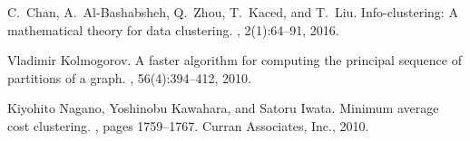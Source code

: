 \documentclass[portrait,final,a1paper,fontscale=0.3]{baposter}
\begin{document}
\begin{poster}
{\begin{thebibliography}{1}
 C.~Chan, A.~Al-Bashabsheh, Q.~Zhou, T.~Kaced, and T.~Liu.
\newblock Info-clustering: A mathematical theory for data clustering.
, 2(1):64--91, 2016.
  
Vladimir Kolmogorov.
\newblock A faster algorithm for computing the principal sequence of partitions
  of a graph.
, 56(4):394--412, 2010.

Kiyohito Nagano, Yoshinobu Kawahara, and Satoru Iwata.
\newblock Minimum average cost clustering.
, pages 1759--1767. Curran Associates, Inc., 2010.

      \end{thebibliography}
   \vspace{0.05em}
  }


\end{poster}
\end{document}
